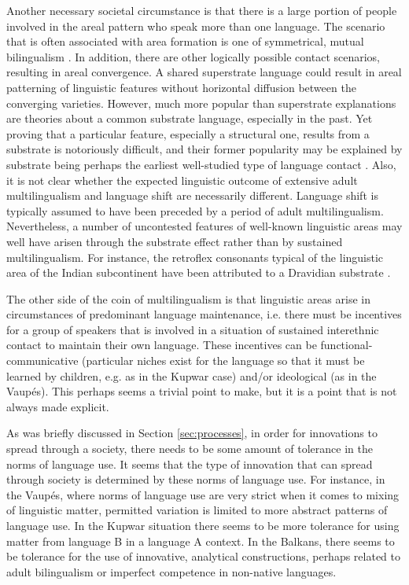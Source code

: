 \documentclass[output=paper,
modfonts
]{langscibook}
\begin{document}
Another necessary societal circumstance is that there is a large portion of people involved in the areal pattern who speak more than one language. The scenario that is often associated with area formation is one of symmetrical, mutual bilingualism \parencite{muysken2010scenarios}. In addition, there are other logically possible contact scenarios, resulting in areal convergence. A shared superstrate language could result in areal patterning of linguistic features without horizontal diffusion between the converging varieties. However, much more popular than superstrate explanations are theories about a common substrate language, especially in the past. Yet proving that a particular feature, especially a structural one, results from a substrate is notoriously difficult, and their former popularity may be explained by substrate being perhaps the earliest well-studied type of language contact \parencite[see, e.g.,][14--16]{wahlström2015}. Also, it is not clear whether the expected linguistic outcome of extensive adult multilingualism and language shift are necessarily different. Language shift 
is typically assumed to have been preceded by a period of adult multilingualism. Nevertheless, a number of uncontested features of well-known linguistic areas may well have arisen through the substrate effect rather than by sustained multilingualism. For instance, the retroflex consonants typical of the linguistic area of the Indian subcontinent have been attributed to a Dravidian substrate \parencite[39--40]{thomasonetal1988language}.


The other side of the coin of multilingualism is that linguistic areas arise in circumstances of predominant language maintenance, i.e. there must be incentives for a group of speakers that is involved in a situation of sustained interethnic contact to maintain their own language. These incentives can be functional-communicative (particular niches exist for the language so that it must be learned by children, e.g. as in the Kupwar case) and/or ideological (as in the Vaupés). This perhaps seems a trivial point to make, but it is a point that is not always made explicit.\\


As was briefly discussed in Section \ref{sec:processes}, in order for innovations to spread through a society, there needs to be some amount of tolerance in the norms of language use. It seems that the type of innovation that can spread through society is determined by these norms of language use. For instance, in the Vaupés, where norms of language use are very strict when it comes to mixing of linguistic matter, permitted variation is limited to more abstract patterns of language use. In the Kupwar situation there seems to be more tolerance for using matter from language B in a language A context. In the Balkans, there seems to be tolerance for the use of innovative, analytical constructions, perhaps related to adult bilingualism or imperfect competence in non-native languages.
\end{document}
